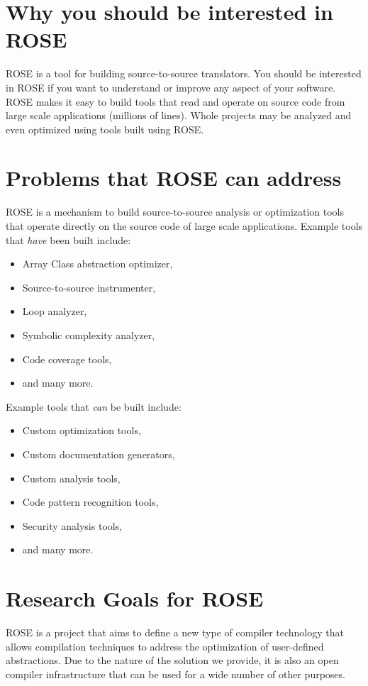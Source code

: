 \section{Why you should be interested in ROSE}

ROSE is a tool for building source-to-source translators.
You should be interested in ROSE if you want to 
understand or improve any aspect of your software. ROSE
makes it easy to build tools that read and operate on source code
from large scale applications (millions of lines).  Whole projects
may be analyzed and even optimized using tools built using ROSE.

\section{Problems that ROSE can address}
    ROSE is a mechanism to build source-to-source analysis or 
optimization tools that operate directly on the source code of large 
scale applications.  Example tools that {\em have} been built include:
\begin{itemize}
   \item Array Class abstraction optimizer,
   \item Source-to-source instrumenter,
   \item Loop analyzer,
   \item Symbolic complexity analyzer,
   \item Code coverage tools,
   \item and many more.
\end{itemize}
Example tools that {\em can} be built include:
\begin{itemize}
   \item Custom optimization tools,
   \item Custom documentation generators,
   \item Custom analysis tools,
   \item Code pattern recognition tools,
   \item Security analysis tools,
   \item and many more.
\end{itemize}


\section{Research Goals for ROSE}
ROSE is a project that aims to define a new type of compiler technology that allows
compilation techniques to address the optimization of user-defined abstractions.
Due to the nature of the solution we provide, it is also an open compiler infrastructure
that can be used for a wide number of other purposes.


